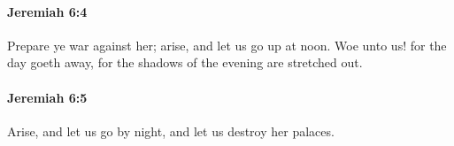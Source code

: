		\paragraph{Jeremiah 6:4} %
			\label{JEREMIAH-6-4}

			Prepare ye war against her; arise, and let us go up at noon. Woe unto us! for the day goeth away, for the shadows of the evening are stretched out.


		\paragraph{Jeremiah 6:5} %
			\label{JEREMIAH-6-5}

			Arise, and let us go by night, and let us destroy her palaces.


